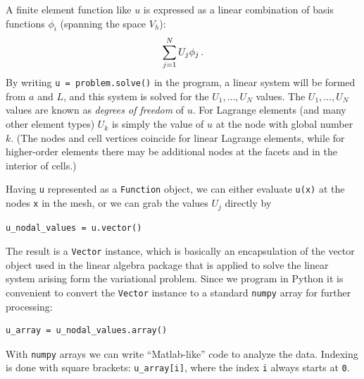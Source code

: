 A finite element function like $u$ is expressed as a linear combination
of basis functions $\phi_i$ (spanning the space $V_h$):
\begin{equation}
\sum_{j=1}^N U_j \phi_j\label{langtangen:poisson1:ufem}\thinspace .
\end{equation}
By writing {\fontsize{12pt}{12pt}\verb!u = problem.solve()!} in the program, a linear system
will be formed from $a$ and $L$, and this system is solved for the
$U_1,\ldots,U_N$ values. The $U_1,\ldots,U_N$ values are known
as \emph{degrees of freedom} of $u$. For Lagrange elements (and many other
element types) $U_k$ is simply the value of $u$ at the node
with global number $k$.
(The nodes and cell vertices coincide for linear Lagrange elements, while
for higher-order elements there may be additional nodes at
the facets and in the interior of cells.)

Having {\fontsize{12pt}{12pt}\texttt{u}} represented as a {\fontsize{12pt}{12pt}\texttt{Function}} object,
we can either evaluate {\fontsize{12pt}{12pt}\texttt{u(x)}} at the nodes {\fontsize{12pt}{12pt}\texttt{x}} in the mesh,
or we can grab the values
$U_j$ directly by
\begin{Verbatim}[fontsize=\fontsize{10pt}{10pt},tabsize=8,baselinestretch=1.05,
fontfamily=tt,xleftmargin=7mm]
u_nodal_values = u.vector()
\end{Verbatim}
\noindent
The result is a \dolfin{} {\fontsize{12pt}{12pt}\verb!Vector!} instance, which is basically an
encapsulation of the vector object used in the linear algebra package
that is applied to solve the linear system arising form the
variational problem.
Since we program in Python it is convenient to convert the
{\fontsize{12pt}{12pt}\verb!Vector!} instance to a standard {\fontsize{12pt}{12pt}\verb!numpy!} array for further
processing:
\begin{Verbatim}[fontsize=\fontsize{10pt}{10pt},tabsize=8,baselinestretch=1.05,
fontfamily=tt,xleftmargin=7mm]
u_array = u_nodal_values.array()
\end{Verbatim}
\noindent
With {\fontsize{12pt}{12pt}\verb!numpy!} arrays we can write ``Matlab-like'' code to analyze
the data. Indexing is done with square brackets: {\fontsize{12pt}{12pt}\verb!u_array[i]!},
where the index {\fontsize{12pt}{12pt}\verb!i!} always starts at {\fontsize{12pt}{12pt}\texttt{0}}.

